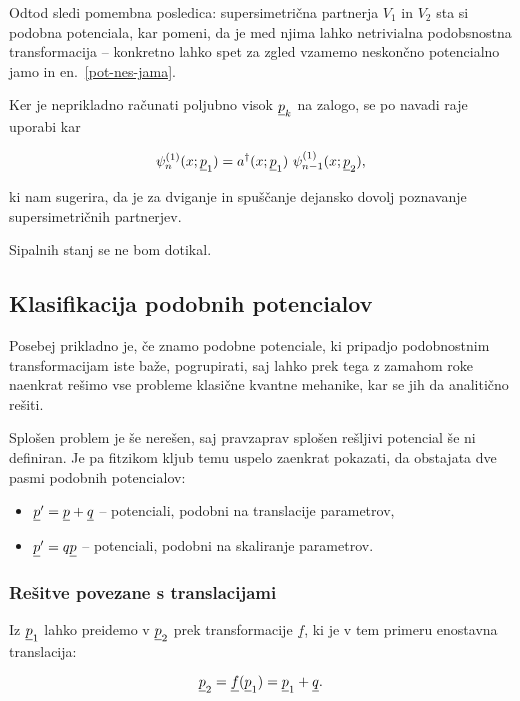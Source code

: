 Odtod sledi pomembna posledica: supersimetri\v cna partnerja $V_1$ in $V_2$ sta si podobna potenciala, kar
pomeni, da je med njima lahko netrivialna podobsnostna transformacija -- konkretno lahko spet za zgled vzamemo
neskon\v cno potencialno jamo in en.~\eqref{pot-nes-jama}.

Ker je neprikladno ra\v cunati poljubno visok $\underline{p}_k$ na zalogo, se po navadi raje uporabi kar

\begin{equation}
	\psi^{(1)}_n (x; \underline{p}_1) = a^\dagger (x; \underline{p}_1)\ \psi_{n-1}^{(1)} (x; \underline{p}_2),
\end{equation}

ki nam sugerira, da je za dviganje in spu\v s\v canje dejansko dovolj poznavanje supersimetri\v cnih
partnerjev.

Sipalnih stanj se ne bom dotikal.

\subsection{Klasifikacija podobnih potencialov}

Posebej prikladno je, \v ce znamo podobne potenciale, ki pripadjo podobnostnim transformacijam iste ba\v ze,
pogrupirati, saj lahko prek tega z zamahom roke naenkrat re\v simo vse probleme klasi\v cne kvantne mehanike,
kar se jih da analiti\v cno re\v siti.

Splo\v sen problem je \v se nere\v sen, saj pravzaprav splo\v sen re\v sljivi potencial \v se ni definiran.
Je pa fitzikom kljub temu uspelo zaenkrat pokazati, da obstajata dve pasmi podobnih potencialov:

\begin{itemize}
	\item{$\underline{p}^\prime = \underline{p} + \underline{q}$ -- potenciali, podobni na translacije parametrov,}
	\item{$\underline{p}^\prime = q\underline{p}$ -- potenciali, podobni na skaliranje parametrov.}
\end{itemize}

\subsubsection{Re\v sitve povezane s translacijami}

Iz $\underline{p}_1$ lahko preidemo v $\underline{p}_2$ prek transformacije $\underline{f}$, ki je v tem primeru enostavna
translacija:

\[
	\underline{p}_2 = \underline{f}(\underline{p}_1) = \underline{p}_1 + \underline{q}.
\]

